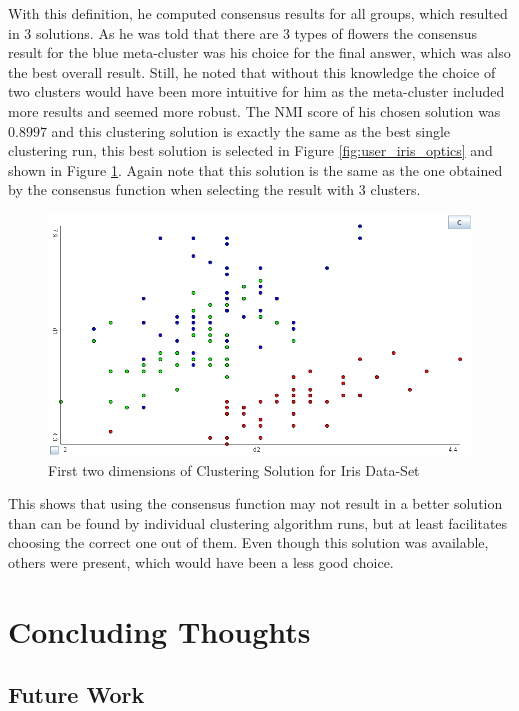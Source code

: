 \documentclass[
	a4paper,
	english,
	twoside,
	openright,               
	11pt                            
	]{report}
\begin{document}
With this definition, he computed consensus results for all groups, which resulted in 3 solutions. As he was told that there are 3 types of flowers the consensus result for the blue meta-cluster was his choice for the final answer, which was also the best overall result. Still, he noted that without this knowledge the choice of two clusters would have been more intuitive for him as the meta-cluster included more results and seemed more robust. The NMI score of his chosen solution was $0.8997$ and this clustering solution is exactly the same as the best single clustering run, this best solution is selected in Figure \ref{fig:user_iris_optics} and shown in Figure \ref{fig:user_iris_best}. Again note that this solution is the same as the one obtained by the consensus function when selecting the result with $3$ clusters.

\begin{figure}[h]
	\centering
	\includegraphics[scale=.4]{user_iris_best}
	\caption{First two dimensions of Clustering Solution for Iris Data-Set}
	\label{fig:user_iris_best}
\end{figure}

This shows that using the consensus function may not result in a better solution than can be found by individual clustering algorithm runs, but at least facilitates choosing the correct one out of them. Even though this solution was available, others were present, which would have been a less good choice.

\part{Concluding Thoughts}

\chapter{Future Work}\label{cha:futurework}
\end{document}
